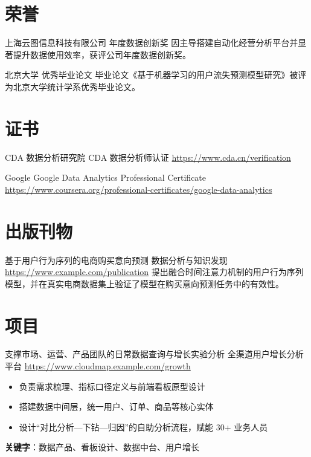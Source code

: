\documentclass[a4paper, serif, 10pt]{moderncv}
\begin{document}
\section{荣誉}

        {上海云图信息科技有限公司}
        {年度数据创新奖}
        {}
        {}
        {因主导搭建自动化经营分析平台并显著提升数据使用效率，获评公司年度数据创新奖。}

        {北京大学}
        {优秀毕业论文}
        {}
        {}
        {毕业论文《基于机器学习的用户流失预测模型研究》被评为北京大学统计学系优秀毕业论文。}
\section{证书}

        {CDA 数据分析研究院}
        {CDA 数据分析师认证}
        {\url{https://www.cda.cn/verification}}
        {}
        {}

        {Google}
        {Google Data Analytics Professional Certificate}
        {\url{https://www.coursera.org/professional-certificates/google-data-analytics}}
        {}
        {}
\section{出版刊物}

        {基于用户行为序列的电商购买意向预测}
        {数据分析与知识发现}
        {\url{https://www.example.com/publication}}
        {}
        {提出融合时间注意力机制的用户行为序列模型，并在真实电商数据集上验证了模型在购买意向预测任务中的有效性。}
\section{项目}

        {支撑市场、运营、产品团队的日常数据查询与增长实验分析}
        {全渠道用户增长分析平台}
        {\url{https://www.cloudmap.example.com/growth}}
        {}
        {\begin{itemize}
\item 负责需求梳理、指标口径定义与前端看板原型设计
\item 搭建数据中间层，统一用户、订单、商品等核心实体
\item 设计“对比分析—下钻—归因”的自助分析流程，赋能 30+ 业务人员
\end{itemize}
\textbf{关键字}：数据产品、看板设计、数据中台、用户增长}
\end{document}
